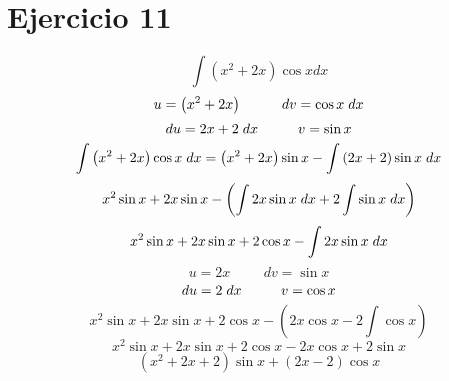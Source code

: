 \documentclass{amsart}
\begin{document}
\section{Ejercicio 11}

    \[\int \left(x^{2} + 2x \right) \cos{x} dx\]
    \[u = \left(x^{2} + 2x \right) \hspace{1cm} dv = \cos{x} \hspace{1mm} dx\]
    \[du = 2x+2 \hspace{1mm} dx \hspace{1cm} v = \sin{x}\]
    \[\int \left(x^2 + 2x \right)\cos{x}\hspace{1mm}dx = \left(x^{2} + 2x \right)\sin{x} - \int{\left(2x + 2\right)\sin{x}\hspace{1mm} dx}\]
    \[x^{2}\sin{x}+2x\sin{x} - \left(\int{2x\sin{x}\hspace{1mm} dx}+2\int{\sin{x}\hspace{1mm} dx}\right)\]
    \[x^{2}\sin{x}+2x\sin{x}+2\cos{x} - \int{2x\sin{x}\hspace{1mm} dx}\]
    \[u = 2x \hspace{1cm} dv = \sin{x}\]
    \[du = 2 \hspace{1mm} dx \hspace{1cm} v = \cos{x}\]
    \[x^{2}\sin{x}+2x\sin{x}+2\cos{x} - \left(2x\cos{x} - 2\int{\cos{x}}\right)\]
    \[x^{2}\sin{x}+2x\sin{x}+2\cos{x} -2x\cos{x} +2\sin{x}\]
    \[\left(x^{2}+2x+2\right)\sin{x}+\left(2x-2\right)\cos{x}\]
    
\end{document}
